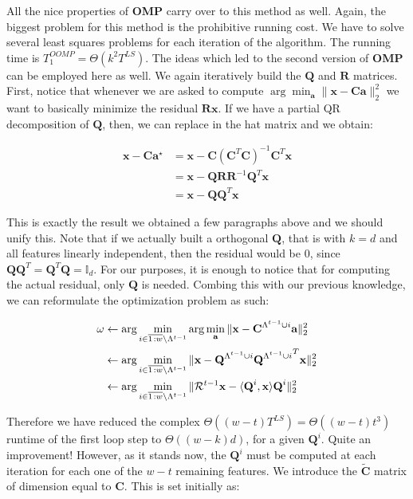 \documentclass[12pt,a4paper,oneside,english]{UPBThesis}
\newcommand{\hcrange}[2]{\overline{{#1}\colon\!\!{#2}}}
\begin{document}
All the nice properties of \textbf{OMP} carry over to this method as well. Again, the biggest problem for this method is the prohibitive running cost. We have to solve several least squares problems for each iteration of the algorithm. The running time is $T_1^{OOMP} = \Theta(k^2T^{LS})$. The ideas which led to the second version of \textbf{OMP} can be employed here as well. We again iteratively build the $\textbf{Q}$ and $\textbf{R}$ matrices. First, notice that whenever we are asked to compute $\arg\min_\textbf{a} \| \textbf{x} - \textbf{C}\textbf{a} \|_2^2$ we want to basically minimize the residual $\textbf{R}\textbf{x}$. If we have a partial QR decomposition of $\textbf{Q}$, then, we can replace in the hat matrix and we obtain:

\begin{align*}
\textbf{x} - \textbf{C}\textbf{a}^\star & = \textbf{x} - \textbf{C}(\textbf{C}^T\textbf{C})^{-1}\textbf{C}^T\textbf{x} \\
& = \textbf{x} - \textbf{Q}\textbf{R}\textbf{R}^{-1}\textbf{Q}^T\textbf{x} \\
& = \textbf{x} - \textbf{Q}\textbf{Q}^T\textbf{x}
\end{align*}

This is exactly the result we obtained a few paragraphs above and we should unify this. Note that if we actually built a orthogonal $\textbf{Q}$, that is with $k = d$ and all features linearly independent, then the residual would be $0$, since $\textbf{Q}\textbf{Q}^T = \textbf{Q}^T\textbf{Q} = \mathbb{I}_d$. For our purposes, it is enough to notice that for computing the actual residual, only $\textbf{Q}$ is needed. Combing this with our previous knowledge, we can reformulate the optimization problem as such:

\begin{align*}
\omega & \gets \arg\min_{i \in \hcrange{1}{w} \setminus \Lambda^{t-1}} \arg\min_\textbf{a} \| \textbf{x} - \textbf{C}^{\Lambda^{t-1} \cup i}\textbf{a} \|_2^2 \\
& \gets \arg\min_{i \in \hcrange{1}{w} \setminus \Lambda^{t-1}} \| \textbf{x} - \textbf{Q}^{\Lambda^{t-1} \cup i}{\textbf{Q}^{\Lambda^{t-1} \cup i}}^T\textbf{x} \|_2^2 \\
& \gets \arg\min_{i \in \hcrange{1}{w} \setminus \Lambda^{t-1}} \| \mathcal{R}^{t-1}\textbf{x} - \langle \textbf{Q}^i, \textbf x \rangle \textbf{Q}^i \|_2^2
\end{align*}

Therefore we have reduced the complex $\Theta((w - t)T^{LS}) = \Theta((w - t)t^3)$ runtime of the first loop step to $\Theta((w - k)d)$, for a given $\textbf{Q}^i$. Quite an improvement! However, as it stands now, the $\textbf{Q}^i$ must be computed at each iteration for each one of the $w - t$ remaining features. We introduce the $\tilde{\textbf{C}}$ matrix of dimension equal to $\textbf{C}$. This is set initially as:
\end{document}
